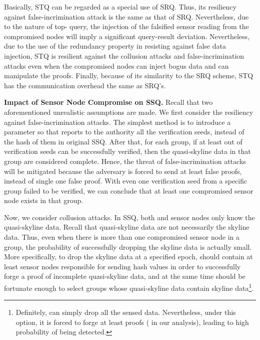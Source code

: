 \documentclass[conference]{IEEEtran}
\begin{document}
Basically, STQ can be regarded as a special use of SRQ. Thus, its resiliency against false-incrimination attack is the same as that of SRQ. Nevertheless, due to the nature of top- query, the injection of the falsified sensor reading from the compromised nodes will imply a significant query-result deviation. Nevertheless, due to the use of the redundancy property in resisting against false data injection, STQ is resilient against the collusion attacks and false-incrimination attacks even when the compromised nodes can inject bogus data and can manipulate the proofs. Finally, because of its similarity to the SRQ scheme, STQ has the communication overhead the same as SRQ's.  

\textbf{Impact of Sensor Node Compromise on SSQ.} Recall that two aforementioned unrealistic assumptions are made. We first consider the resiliency against false-incrimination attacks. The simplest method is to introduce a parameter  so that  reports to the authority all the verification seeds, instead of the hash of them in original SSQ. After that, for each group, if at least  out of  verification seeds can be successfully verified, then the quasi-skyline data in that group are considered complete. Hence, the threat of false-incrimination attacks will be mitigated because the adversary is forced to send at least  false proofs, instead of single one false proof. With even one verification seed from a specific group failed to be verified, we can conclude that at least one compromised sensor node exists in that group.

Now, we consider collusion attacks. In SSQ, both  and sensor nodes only know the quasi-skyline data. Recall that quasi-skyline data are not necessarily the skyline data. Thus, even when there is more than one compromised sensor node in a group, the probability of successfully dropping the skyline data is actually small. More specifically, to drop the skyline data at a specified epoch,  should contain at least  sensor nodes responsible for sending hash values in order to successfully forge a proof of incomplete quasi-skyline data, and at the same time should be fortunate enough to select groups whose quasi-skyline data contain skyline data\footnote{Definitely,  can simply drop all the sensed data. Nevertheless, under this option, it is forced to forge at least  proofs ( in our analysis), leading to high probability of being detected.}.
\end{document}
